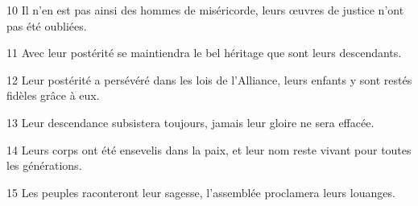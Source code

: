 
10 Il n’en est pas ainsi des hommes de miséricorde, leurs œuvres de justice n’ont pas été oubliées.

11 Avec leur postérité se maintiendra le bel héritage que sont leurs descendants.

12 Leur postérité a persévéré dans les lois de l’Alliance, leurs enfants y sont restés fidèles grâce à eux.

13 Leur descendance subsistera toujours, jamais leur gloire ne sera effacée.

14 Leurs corps ont été ensevelis dans la paix, et leur nom reste vivant pour toutes les générations.

15 Les peuples raconteront leur sagesse, l’assemblée proclamera leurs louanges.
